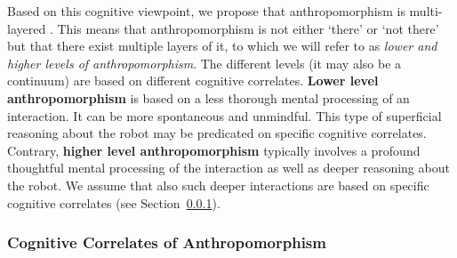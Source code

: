 \documentclass{frontiersSCNS} %
\begin{document}
Based on this cognitive viewpoint, 
we propose that anthropomorphism is multi-layered \citep{persson_anthropomorphism_2000}. This means that anthropomorphism is not either `there' or `not there' but that there exist multiple layers of it, to which we will refer to as \textit{lower and higher levels of anthropomorphism}. The different levels (it may also be a continuum) are based on different cognitive correlates. 
\textbf{Lower level anthropomorphism} is based on a less thorough mental processing of an interaction. It can be more spontaneous and unmindful. This type of superficial reasoning about the robot may be predicated on specific cognitive correlates.
Contrary, \textbf{higher level anthropomorphism} typically involves a profound thoughtful mental processing of the interaction as well as deeper reasoning about the robot. We assume that also such deeper interactions are based on specific cognitive correlates (see Section~\ref{sec:cognitive-correlates}).


\subsubsection{Cognitive Correlates of Anthropomorphism\\}
\label{sec:cognitive-correlates}
\end{document}

